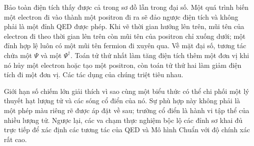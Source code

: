 \begin{classroomqa}
\end{classroomqa}

Bảo toàn điện tích thấy được cả trong sơ đồ lẫn trong đại số. Một quá trình biến một electron đi vào thành một positron đi ra sẽ đảo ngược điện tích và không phải là một đỉnh QED được phép. Khi vẽ thời gian hướng lên trên, mũi tên của electron đi theo thời gian lên trên còn mũi tên của positron chỉ xuống dưới; một đỉnh hợp lệ luôn có một mũi tên fermion đi xuyên qua. Về mặt đại số, tương tác chứa một \(\Psi\) và một \(\Psi^\dagger\). Toán tử thứ nhất làm tăng điện tích thêm một đơn vị khi nó hủy một electron hoặc tạo một positron, còn toán tử thứ hai làm giảm điện tích đi một đơn vị. Các tác dụng của chúng triệt tiêu nhau.

\begin{classroomqa}
\end{classroomqa}

\begin{classroomqa}
\end{classroomqa}

Giới hạn số chiếm lớn giải thích vì sao cùng một biểu thức có thể chi phối một lý thuyết hạt lượng tử và các sóng cổ điển của nó. Sự phù hợp này không phải là một phép màu riêng rẽ được áp đặt về sau; trường cổ điển là hành vi tập thể của nhiều lượng tử. Ngược lại, các va chạm thực nghiệm bộc lộ các đỉnh sơ khai đủ trực tiếp để xác định các tương tác của QED và Mô hình Chuẩn với độ chính xác rất cao.

